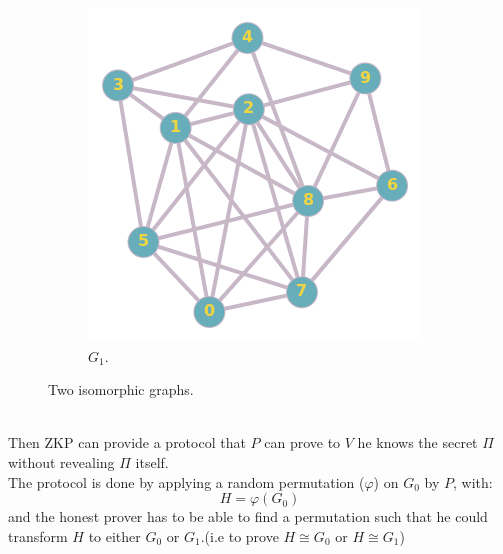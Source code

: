 \documentclass[12pt,a4paper]{article}
\begin{document}
\begin{figure}[h!]
\begin{subfigure}[b]{.39\linewidth}
		\includegraphics[width=\linewidth]{ex2_2.png}
		\caption{$G_1$.}
	\end{subfigure}
	\caption{Two isomorphic graphs.}
	\label{fig:Two isomorphic graphs has 10 vertices and 28 edges}
\end{figure}\\
Then ZKP can provide a protocol that $P$ can prove to $V$ he knows the secret $\Pi$ without revealing $\Pi$ itself.\\
The protocol is done by applying a random permutation ($\varphi$) on $G_0$ by $P$, with: $$H=\varphi(G_0)$$ and the honest prover has to be able to find a permutation such that he could transform $H$ to either $G_0$ or $G_1$.(i.e to prove $H\cong G_0$ or $H\cong G_1$)\\
\end{document}
